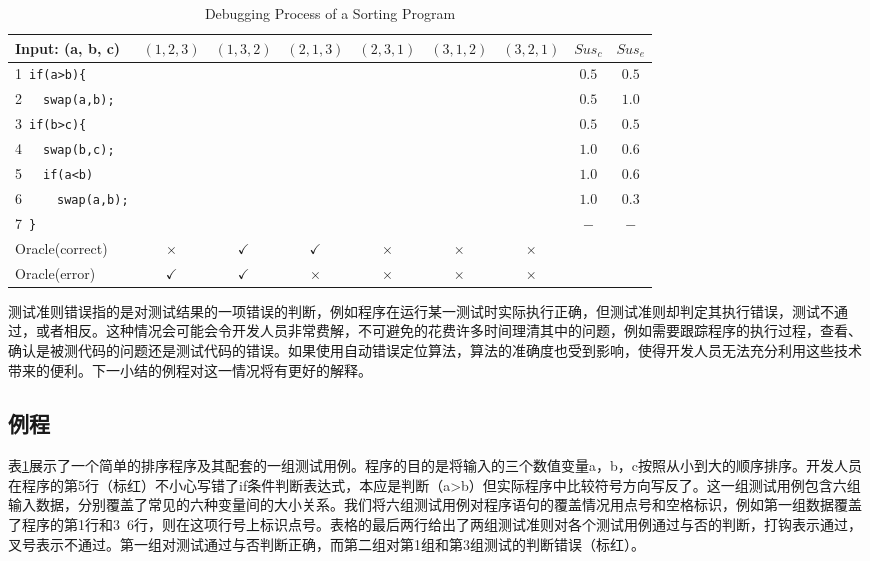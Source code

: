 \begin{table}[!t]
	\centering
	\caption{Debugging Process of a Sorting Program}\label{tab: Sorting}
	\begin{tabular}{l|c|c|c|c|c|c|c|c}
		\hline Input: (a, b, c) & $(1,2,3)$ & $(1,3,2)$ & $(2,1,3)$ & $(2,3,1)$ & $(3,1,2)$ & $(3,2,1)$ & $Sus_c$ & $Sus_e$ \\ 
		\hline 1\ \texttt{if(a>b)\{} & \textbullet & \textbullet & \textbullet & \textbullet & \textbullet & \textbullet & $0.5$ & $0.5$ \\ 
		\cline{2-9} 2\ \ \ \texttt{swap(a,b);} &  &  & \textbullet &  & \textbullet & \textbullet & $0.5$ & $1.0$ \\ 
		\cline{2-9} 3\ \texttt{if(b>c)\{} & \textbullet & \textbullet & \textbullet & \textbullet & \textbullet & \textbullet & $0.5$ & $0.5$ \\ 
		\cline{2-9} 4\ \ \ \texttt{swap(b,c);} & \textbullet &  &  & \textbullet & \textbullet & \textbullet & $1.0$ & $0.6$ \\ 
		\cline{2-9} 5\ \ \ \texttt{\color{red}if(a<b)} & \textbullet &  &  & \textbullet & \textbullet & \textbullet & $1.0$ & $0.6$ \\ 
		\cline{2-9} 6\ \ \ \ \ \texttt{swap(a,b);} & \textbullet &  &  &  & \textbullet &  & $1.0$ & $0.3$ \\ 
		\cline{2-9} 7\ \texttt{\}} &  &  &  &  &  &  & $-$ & $-$ \\ 
		
		\hline Oracle(correct) & $\times$ & $\checkmark$ & $\checkmark$ & $\times$ & $\times$ & $\times$ &  &  \\ 
		\hline Oracle(error) & \color{red}$\checkmark$ & $\checkmark$ & \color{red}$\times$ & $\times$ & $\times$ & $\times$ &  &  \\ 
		\hline 
	\end{tabular} 
\end{table}
测试准则错误指的是对测试结果的一项错误的判断，例如程序在运行某一测试时实际执行正确，但测试准则却判定其执行错误，测试不通过，或者相反。这种情况会可能会令开发人员非常费解，不可避免的花费许多时间理清其中的问题，例如需要跟踪程序的执行过程，查看、确认是被测代码的问题还是测试代码的错误。如果使用自动错误定位算法，算法的准确度也受到影响，使得开发人员无法充分利用这些技术带来的便利。下一小结的例程对这一情况将有更好的解释。

\subsection{例程}
表\ref{tab: Sorting}展示了一个简单的排序程序及其配套的一组测试用例。程序的目的是将输入的三个数值变量a，b，c按照从小到大的顺序排序。开发人员在程序的第5行（标红）不小心写错了if条件判断表达式，本应是判断（a>b）但实际程序中比较符号方向写反了。这一组测试用例包含六组输入数据，分别覆盖了常见的六种变量间的大小关系。我们将六组测试用例对程序语句的覆盖情况用点号和空格标识，例如第一组数据覆盖了程序的第1行和3~6行，则在这项行号上标识点号。表格的最后两行给出了两组测试准则对各个测试用例通过与否的判断，打钩表示通过，叉号表示不通过。第一组对测试通过与否判断正确，而第二组对第1组和第3组测试的判断错误（标红）。

